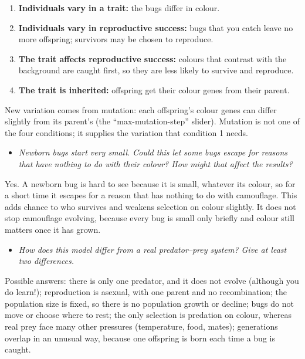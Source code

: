 \documentclass[
  a4paper]{book}
\providecommand{\tightlist}{%
  \setlength{\itemsep}{0pt}\setlength{\parskip}{0pt}}
\begin{document}
\begin{enumerate}
\def\labelenumi{\arabic{enumi}.}
\tightlist
\item
  \textbf{Individuals vary in a trait:} the bugs differ in colour.
\item
  \textbf{Individuals vary in reproductive success:} bugs that you catch leave no more offspring; survivors may be chosen to reproduce.
\item
  \textbf{The trait affects reproductive success:} colours that contrast with the background are caught first, so they are less likely to survive and reproduce.
\item
  \textbf{The trait is inherited:} offspring get their colour genes from their parent.
\end{enumerate}

New variation comes from mutation: each offspring's colour genes can differ slightly from its parent's (the ``max-mutation-step'' slider). Mutation is not one of the four conditions; it supplies the variation that condition 1 needs.

\begin{itemize}
\tightlist
\item
  \emph{Newborn bugs start very small. Could this let some bugs escape for reasons that have nothing to do with their colour? How might that affect the results?}
\end{itemize}

Yes. A newborn bug is hard to see because it is small, whatever its colour, so for a short time it escapes for a reason that has nothing to do with camouflage. This adds chance to who survives and weakens selection on colour slightly. It does not stop camouflage evolving, because every bug is small only briefly and colour still matters once it has grown.

\begin{itemize}
\tightlist
\item
  \emph{How does this model differ from a real predator--prey system? Give at least two differences.}
\end{itemize}

Possible answers: there is only one predator, and it does not evolve (although you do learn!); reproduction is asexual, with one parent and no recombination; the population size is fixed, so there is no population growth or decline; bugs do not move or choose where to rest; the only selection is predation on colour, whereas real prey face many other pressures (temperature, food, mates); generations overlap in an unusual way, because one offspring is born each time a bug is caught.
\end{document}
